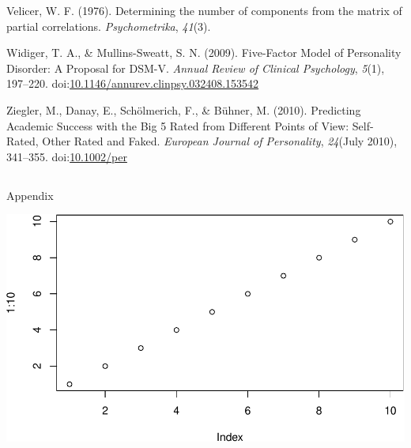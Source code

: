 \documentclass[man]{apa6}
\theoremstyle{definition}
\theoremstyle{definition}
\theoremstyle{definition}
\theoremstyle{remark}
\begin{document}
\leavevmode\hypertarget{ref-Velicer1976}{}%
Velicer, W. F. (1976). Determining the number of components from the
matrix of partial correlations. \emph{Psychometrika}, \emph{41}(3).

\leavevmode\hypertarget{ref-WidigerMullins2009}{}%
Widiger, T. A., \& Mullins-Sweatt, S. N. (2009). Five-Factor Model of
Personality Disorder: A Proposal for DSM-V. \emph{Annual Review of
Clinical Psychology}, \emph{5}(1), 197--220.
doi:\href{https://doi.org/10.1146/annurev.clinpsy.032408.153542}{10.1146/annurev.clinpsy.032408.153542}

\leavevmode\hypertarget{ref-Ziegler2010}{}%
Ziegler, M., Danay, E., Schölmerich, F., \& Bühner, M. (2010).
Predicting Academic Success with the Big 5 Rated from Different Points
of View: Self-Rated, Other Rated and Faked. \emph{European Journal of
Personality}, \emph{24}(July 2010), 341--355.
doi:\href{https://doi.org/10.1002/per}{10.1002/per}

\endgroup


\clearpage
\renewcommand{\listtablename}{Table captions}
\listoftables



  \clearpage
  \makeatletter
  \efloat@restorefloats
  \makeatother
  
  
\begin{appendix}
\section{}
Appendix

\includegraphics{IPIP_draft_files/figure-latex/unnamed-chunk-2-1.pdf}
\end{appendix}
\end{document}
